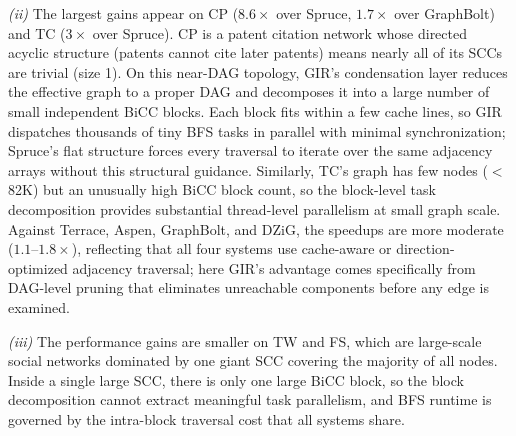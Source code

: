 \textit{(ii)} The largest gains appear on CP ($8.6\times$ over Spruce, $1.7\times$ over GraphBolt) and TC ($3\times$ over Spruce).
CP is a patent citation network whose directed acyclic structure (patents cannot cite later patents) means nearly all of its SCCs are trivial (size 1).
On this near-DAG topology, GIR's condensation layer reduces the effective graph to a proper DAG and decomposes it into a large number of small independent BiCC blocks.
Each block fits within a few cache lines, so GIR dispatches thousands of tiny BFS tasks in parallel with minimal synchronization; Spruce's flat structure forces every traversal to iterate over the same adjacency arrays without this structural guidance.
Similarly, TC's graph has few nodes ($<$82K) but an unusually high BiCC block count, so the block-level task decomposition provides substantial thread-level parallelism at small graph scale.
Against Terrace, Aspen, GraphBolt, and DZiG, the speedups are more moderate ($1.1$--$1.8\times$), reflecting that all four systems use cache-aware or direction-optimized adjacency traversal; here GIR's advantage comes specifically from DAG-level pruning that eliminates unreachable components before any edge is examined.

\textit{(iii)} The performance gains are smaller on TW and FS, which are large-scale social networks dominated by one giant SCC covering the majority of all nodes.
Inside a single large SCC, there is only one large BiCC block, so the block decomposition cannot extract meaningful task parallelism, and BFS runtime is governed by the intra-block traversal cost that all systems share.

